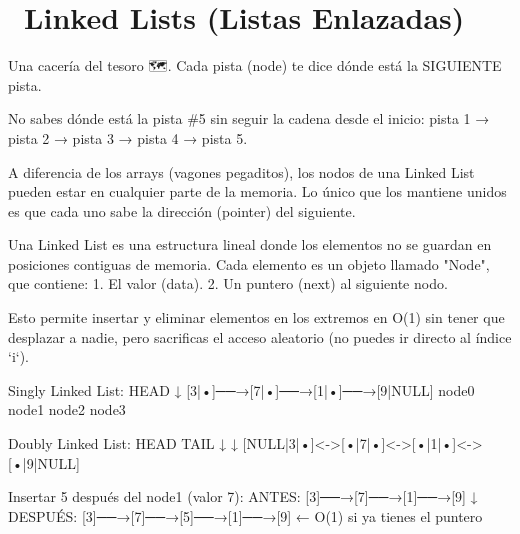 ﻿\chapter[\emj{🔗}~Linked Lists (Listas Enlazadas)]{~Linked Lists (Listas Enlazadas)}

\begin{dsaquees}

Una cacería del tesoro 🗺️. Cada pista (node) te dice dónde está la 
SIGUIENTE pista. 

No sabes dónde está la pista \#5 sin seguir la cadena desde el inicio: 
pista 1 → pista 2 → pista 3 → pista 4 → pista 5. 

A diferencia de los arrays (vagones pegaditos), los nodos de una 
Linked List pueden estar en cualquier parte de la memoria. Lo único
que los mantiene unidos es que cada uno sabe la dirección (pointer)
del siguiente.

\end{dsaquees}

\begin{dsaotraforma}

Una Linked List es una estructura lineal donde los elementos no se
guardan en posiciones contiguas de memoria. Cada elemento es un objeto
llamado "Node", que contiene:
1. El valor (data).
2. Un puntero (next) al siguiente nodo.

Esto permite insertar y eliminar elementos en los extremos en O(1) 
sin tener que desplazar a nadie, pero sacrificas el acceso aleatorio
(no puedes ir directo al índice `i`).

\end{dsaotraforma}

\begin{dsadiagrama}
Singly Linked List:
HEAD
 ↓
[3|•]──→[7|•]──→[1|•]──→[9|NULL]
 node0   node1   node2   node3

Doubly Linked List:
HEAD                      TAIL
 ↓                         ↓
[NULL|3|•]<->[•|7|•]<->[•|1|•]<->[•|9|NULL]

Insertar 5 después del node1 (valor 7):
ANTES:   [3]──→[7]──→[1]──→[9]
                ↓
DESPUÉS: [3]──→[7]──→[5]──→[1]──→[9]   ← O(1) si ya tienes el puntero
\end{dsadiagrama}

